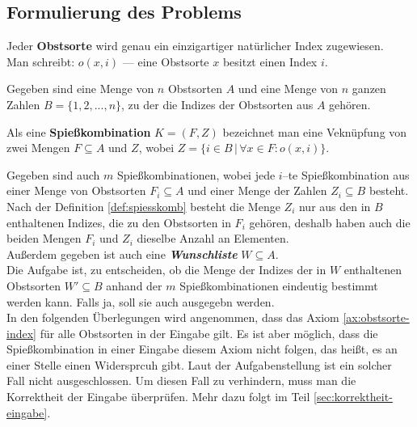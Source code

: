 \subsection{Formulierung des Problems}
\begin{axiom}\label{ax:obstsorte-index}
Jeder \textbf{Obstsorte} wird genau ein einzigartiger natürlicher Index zugewiesen.\\
Man schreibt: $o(x, i)$ --- eine Obstsorte $x$ besitzt einen Index $i$.
\end{axiom}

Gegeben sind eine Menge von $n$ Obstsorten $A$ und eine Menge von $n$ ganzen Zahlen
$B = \{1, 2, ..., n\}$, zu der die Indizes der Obstsorten aus $A$ gehören.

\begin{definition}[Spießkombination]\label{def:spiesskomb}
Als eine \textbf{Spießkombination} $K = (F, Z)$ bezeichnet man eine Veknüpfung von zwei Mengen 
$F \subseteq A$ und $Z$, wobei $Z = \{i \in B \,|\, \forall x \in F : o(x, i)\}.$
\end{definition}

Gegeben sind auch $m$ Spießkombinationen, wobei jede $i$--te Spießkombination
aus einer Menge von Obstsorten $F_i \subseteq A$ und einer Menge der Zahlen $Z_i \subseteq B$ besteht. 
Nach der Definition \ref{def:spiesskomb} besteht die Menge $Z_i$ nur aus
den in $B$ enthaltenen Indizes, die zu den Obstsorten in $F_i$ gehören, deshalb haben auch die beiden Mengen
$F_i$ und $Z_i$ dieselbe Anzahl an Elementen.\\
Außerdem gegeben ist auch eine \textit{\textbf{Wunschliste}} $W \subseteq A$.\\

Die Aufgabe ist, zu entscheiden,
ob die Menge der Indizes der in $W$ enthaltenen Obstsorten $W' \subseteq B$ anhand der $m$ 
Spießkombinationen eindeutig bestimmt werden kann. Falls ja, soll sie auch ausgegebn werden.\\

In den folgenden Überlegungen wird angenommen, dass das Axiom \ref{ax:obstsorte-index} für alle
Obstsorten in der Eingabe gilt.
Es ist aber möglich, dass die Spießkombination in einer Eingabe diesem Axiom nicht folgen, das heißt,
es an einer Stelle einen Widersprcuh gibt.
Laut der Aufgabenstellung ist ein solcher Fall nicht ausgeschlossen. 
Um diesen Fall zu verhindern, muss man die Korrektheit der Eingabe überprüfen. 
Mehr dazu folgt im Teil \ref{sec:korrektheit-eingabe}.
